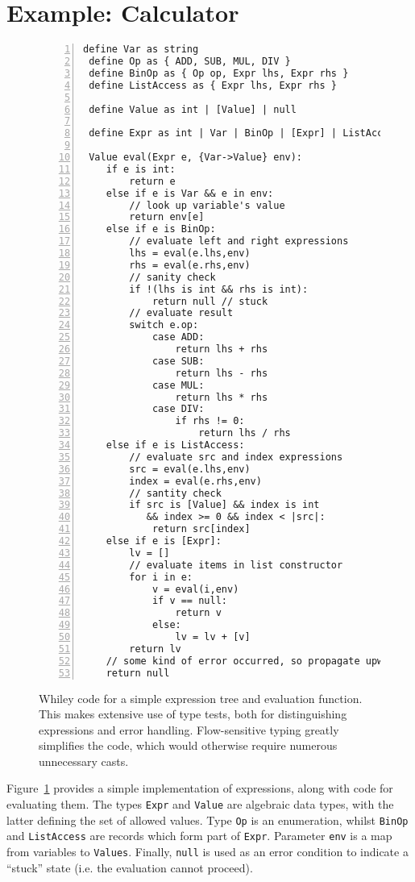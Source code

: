 \newpage
\section{Example: Calculator}
\begin{figure}[!p]
\begin{lstlisting}[numbers=left]
 define Var as string
 define Op as { ADD, SUB, MUL, DIV }
 define BinOp as { Op op, Expr lhs, Expr rhs } 
 define ListAccess as { Expr lhs, Expr rhs } 

 define Value as int | [Value] | null

 define Expr as int | Var | BinOp | [Expr] | ListAccess 

 Value eval(Expr e, {Var->Value} env):
    if e is int:
        return e
    else if e is Var && e in env:
        // look up variable's value
        return env[e]
    else if e is BinOp:
        // evaluate left and right expressions
        lhs = eval(e.lhs,env)
        rhs = eval(e.rhs,env)
        // sanity check
        if !(lhs is int && rhs is int):
            return null // stuck
        // evaluate result
        switch e.op:
            case ADD:
                return lhs + rhs
            case SUB:
                return lhs - rhs
            case MUL:
                return lhs * rhs
            case DIV:
                if rhs != 0:
                    return lhs / rhs
    else if e is ListAccess:
        // evaluate src and index expressions
        src = eval(e.lhs,env)
        index = eval(e.rhs,env)
        // santity check
        if src is [Value] && index is int
           && index >= 0 && index < |src|:
            return src[index]
    else if e is [Expr]:
        lv = []
        // evaluate items in list constructor
        for i in e:
            v = eval(i,env)
            if v == null:
                return v
            else:
                lv = lv + [v]
        return lv
    // some kind of error occurred, so propagate upwards
    return null
\end{lstlisting}
\caption{Whiley code for a simple expression tree and evaluation
  function.  This makes extensive use of type tests, both for
  distinguishing expressions and error handling.  Flow-sensitive
  typing greatly simplifies the code, which would otherwise require
  numerous unnecessary casts.}
\label{eg1}
\end{figure}

Figure~\ref{eg1} provides a simple implementation of expressions,
along with code for evaluating them.  The types \lstinline{Expr} and
\lstinline{Value} are algebraic data types, with the latter defining
the set of allowed values.  Type \lstinline{Op} is an enumeration,
whilst \lstinline{BinOp} and \lstinline{ListAccess} are records which
form part of \lstinline{Expr}.  Parameter \lstinline{env} is a map
from variables to \lstinline{Values}.  Finally, \lstinline{null} is
used as an error condition to indicate a ``stuck'' state (i.e. the
evaluation cannot proceed).

